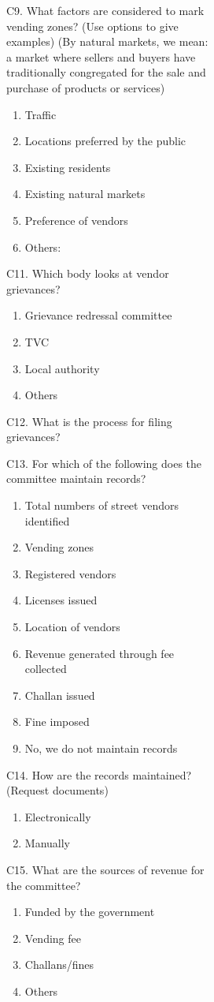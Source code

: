 \documentclass[a4paper, 12pt, twoside]{article}
\begin{document}
\begin{figure}
{\begin{figure}
\begin{figure}
\begin{mdframed}[backgroundcolor=gray!20]
\begin{enumerate}[nosep]
C9. What factors are considered to mark vending zones? (Use options to give examples)
(By natural markets, we mean: a market where sellers and buyers have traditionally congregated for the sale and purchase of products or services)
\begin{enumerate}[nosep]
\item Traffic
\item Locations preferred by the public
\item Existing residents
\item Existing natural markets
\item Preference of vendors
\item Others:
\end{enumerate}


C11. Which body looks at vendor grievances?
\begin{enumerate}[nosep]
\item Grievance redressal committee
\item TVC
\item Local authority
\item Others
\end{enumerate}

C12. What is the process for filing grievances?

C13.  For which of the following does the committee maintain records?
\begin{enumerate}[nosep]
\item Total numbers of street vendors identified
\item Vending zones
\item Registered vendors
\item Licenses issued
\item Location of vendors
\item Revenue generated through fee collected
\item Challan issued
\item Fine imposed
\item No, we do not maintain records
\end{enumerate}

C14. How are the records maintained? (Request documents)
\begin{enumerate}[nosep]
\item Electronically
\item Manually
\end{enumerate}


C15. What are the sources of revenue for the committee?
\begin{enumerate}[nosep]
\item Funded by the government
\item Vending fee
\item Challans/fines
\item Others
\end{enumerate}



\end{enumerate}
\end{mdframed}
\end{figure}
\end{figure}}
\end{figure}
\end{document}
